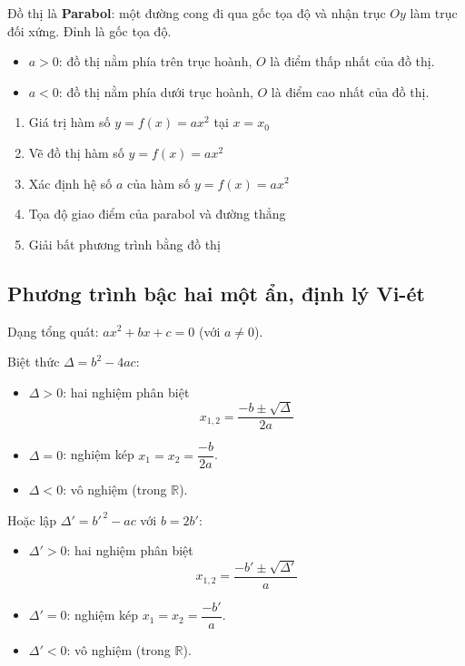 \documentclass[12pt,a4paper]{article}
\begin{document}
\begin{tinhchat}
  Đồ thị là \textbf{Parabol}: một đường cong đi qua gốc tọa độ và nhận trục $Oy$ làm trục đối xứng. Đỉnh là gốc tọa độ.
  \begin{itemize}
    \item $a > 0$: đồ thị nằm phía trên trục hoành, $O$ là điểm thấp nhất của đồ thị.
    \item $a < 0$: đồ thị nằm phía dưới trục hoành, $O$ là điểm cao nhất của đồ thị.
  \end{itemize}
\end{tinhchat}

\begin{enumerate}[label=\textbf{Dạng \arabic*:}, leftmargin=*, align=left]
  \item Giá trị hàm số $y = f(x) = ax^2$ tại $x = x_0$
  \item Vẽ đồ thị hàm số $y = f(x) = ax^2$
  \item Xác định hệ số $a$ của hàm số $y = f(x) = ax^2$
  \item Tọa độ giao điểm của parabol và đường thẳng
  \item Giải bất phương trình bằng đồ thị
\end{enumerate}

\subsection{Phương trình bậc hai một ẩn, định lý Vi-ét}

\begin{dinhnghia}
  Dạng tổng quát: $ax^2 + bx + c = 0$ \quad (với $a \neq 0$).
\end{dinhnghia}

\begin{congthuc}[title={Công thức nghiệm}]
  Biệt thức $\Delta = b^2 - 4ac$:
  \begin{itemize}
    \item $\Delta > 0$: hai nghiệm phân biệt
    \[x_{1,2} = \frac{-b \pm \sqrt{\Delta}}{2a}\]
    \item $\Delta = 0$: nghiệm kép $x_1 = x_2 = \dfrac{-b}{2a}$.
    \item $\Delta < 0$: vô nghiệm (trong $\mathbb{R}$).
  \end{itemize}

  \vspace{6pt}
  Hoặc lập $\Delta' = b'^{\,2} - ac$ với $b = 2b'$:
  \begin{itemize}
    \item $\Delta' > 0$: hai nghiệm phân biệt
    \[x_{1,2} = \frac{-b' \pm \sqrt{\Delta'}}{a}\]
    \item $\Delta' = 0$: nghiệm kép $x_1 = x_2 = \dfrac{-b'}{a}$.
    \item $\Delta' < 0$: vô nghiệm (trong $\mathbb{R}$).
  \end{itemize}
\end{congthuc}
\end{document}
